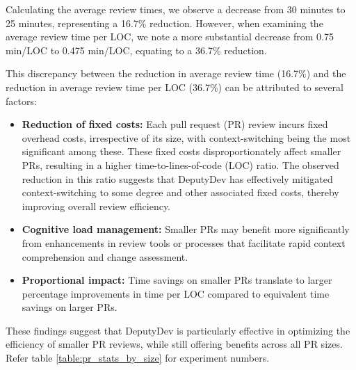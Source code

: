 Calculating the average review times, we observe a decrease from 30 minutes to 25 minutes, representing a 16.7\% reduction. However, when examining the average review time per LOC, we note a more substantial decrease from 0.75 min/LOC to 0.475 min/LOC, equating to a 36.7\% reduction.

This discrepancy between the reduction in average review time (16.7\%) and the reduction in average review time per LOC (36.7\%) can be attributed to several factors:

\begin{itemize}
    \item \textbf{Reduction of fixed costs:} Each pull request (PR) review incurs fixed overhead costs, irrespective of its size, with context-switching being the most significant among these. These fixed costs disproportionately affect smaller PRs, resulting in a higher time-to-lines-of-code (LOC) ratio. The observed reduction in this ratio suggests that DeputyDev has effectively mitigated context-switching to some degree and other associated fixed costs, thereby improving overall review efficiency.
    \item \textbf{Cognitive load management:} Smaller PRs may benefit more significantly from enhancements in review tools or processes that facilitate rapid context comprehension and change assessment.
    \item \textbf{Proportional impact:} Time savings on smaller PRs translate to larger percentage improvements in time per LOC compared to equivalent time savings on larger PRs.
\end{itemize}

These findings suggest that DeputyDev is particularly effective in optimizing the efficiency of smaller PR reviews, while still offering benefits across all PR sizes. Refer table \ref{table:pr_stats_by_size} for experiment numbers.


